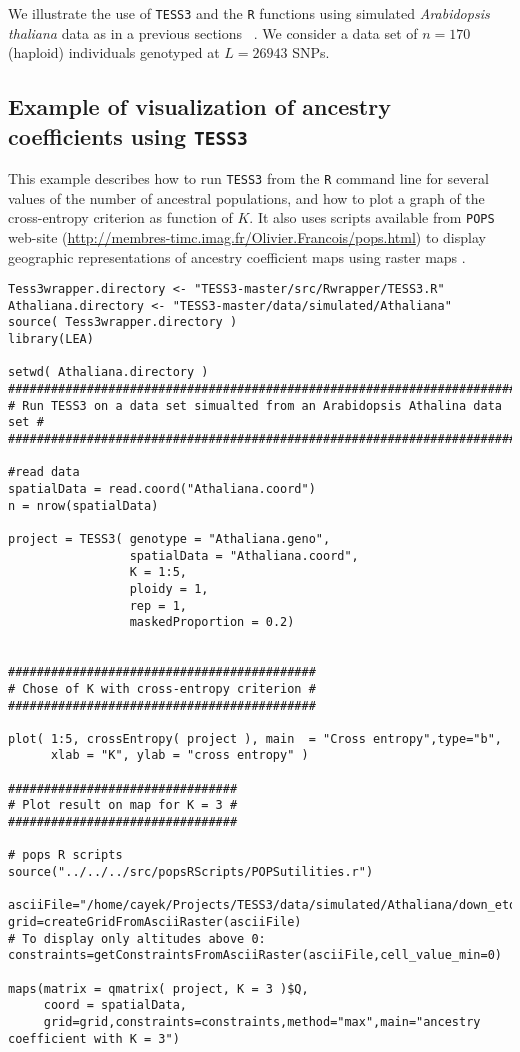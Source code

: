 \documentclass[10pt,a4paper]{article}
\begin{document}
We illustrate the use of {\tt TESS3} and the {\tt R} functions using simulated {\it Arabidopsis thaliana} data as in a previous sections ~\cite{atwell2010genome}. We consider a data set of $n = 170$ (haploid) individuals genotyped at $L = 26943$ SNPs.

\subsection{Example of visualization of ancestry coefficients using {\tt TESS3}}

This example describes how to run {\tt TESS3} from the {\tt R} command line for several values of the number of ancestral populations, and how to plot a graph of the cross-entropy criterion as function of $K$. It also uses scripts available from {\tt POPS} web-site (\url{http://membres-timc.imag.fr/Olivier.Francois/pops.html}) to display geographic representations of ancestry coefficient maps using raster maps \cite{jay2012forecasting}. 

\begin{Verbatim}[frame=single]
Tess3wrapper.directory <- "TESS3-master/src/Rwrapper/TESS3.R"
Athaliana.directory <- "TESS3-master/data/simulated/Athaliana"
source( Tess3wrapper.directory )
library(LEA)

setwd( Athaliana.directory )
###########################################################################
# Run TESS3 on a data set simualted from an Arabidopsis Athalina data set #
###########################################################################

#read data
spatialData = read.coord("Athaliana.coord")
n = nrow(spatialData)

project = TESS3( genotype = "Athaliana.geno", 
                 spatialData = "Athaliana.coord", 
                 K = 1:5, 
                 ploidy = 1, 
                 rep = 1, 
                 maskedProportion = 0.2)


###########################################
# Chose of K with cross-entropy criterion #
###########################################

plot( 1:5, crossEntropy( project ), main  = "Cross entropy",type="b", 
      xlab = "K", ylab = "cross entropy" )

################################
# Plot result on map for K = 3 #
################################

# pops R scripts
source("../../../src/popsRScripts/POPSutilities.r")

asciiFile="/home/cayek/Projects/TESS3/data/simulated/Athaliana/down_etopo1.asc"
grid=createGridFromAsciiRaster(asciiFile)
# To display only altitudes above 0:
constraints=getConstraintsFromAsciiRaster(asciiFile,cell_value_min=0)

maps(matrix = qmatrix( project, K = 3 )$Q,
     coord = spatialData,
     grid=grid,constraints=constraints,method="max",main="ancestry coefficient with K = 3")
\end{Verbatim}
\end{document}
